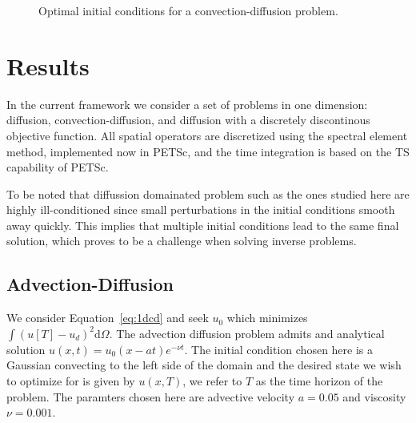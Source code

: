 \documentclass[10pt]{article}
\renewcommand{\d}{\mathrm{d}}
\begin{document}
\begin{figure}[!h]
\centering
{}
\quad
{}
\caption{Optimal initial conditions for a convection-diffusion problem.}
\end{figure}
\section{Results}

In the current framework we consider a set of problems in one dimension: diffusion, convection-diffusion, and diffusion with a discretely discontinous objective function. All spatial operators are discretized using the spectral element method, implemented now in PETSc, and the time integration is based on the TS capability of PETSc.

To be noted that diffussion domainated problem such as the ones studied here are highly ill-conditioned since small perturbations in the initial conditions smooth away quickly. This implies that multiple initial conditions lead to the same final solution, which proves to be a challenge when solving inverse problems.


\subsection{Advection-Diffusion}
We consider Equation~\ref{eq:1dcd} and seek $u_0$ which minimizes $\int (u[T]-u_d)^2\d \Omega$. 
The advection diffusion problem admits and analytical solution $u(x,t)=u_0(x-at)e^{-\nu t}$. The initial condition chosen here is a Gaussian convecting to the left side of the domain and the desired state we wish to optimize for is given by $u(x,T)$, we refer to $T$ as the time horizon of the problem. The paramters chosen here are advective velocity $a=0.05$ and viscosity $\nu=0.001$.
\end{document}
